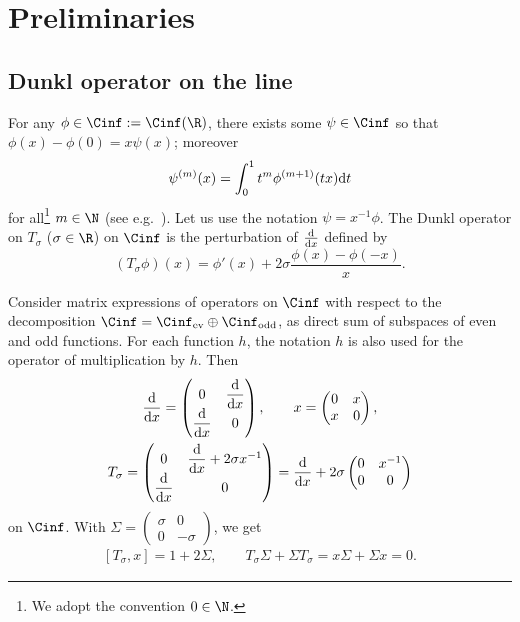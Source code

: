 \section{Preliminaries}\label{s:preliminaries}

\subsection{Dunkl operator on the line}\label{ss:D sigma}

For any $\phi\in\Cinf:=\Cinf(\R)$, there exists some $\psi\in\Cinf$ so that $\phi(x)-\phi(0)=x\psi(x)$; moreover
  \begin{gather}\label{psi (m)(x)}
    \psi^{(m)}(x)=\int_0^1t^m\phi^{(m+1)}(tx){\rm d}t
  \end{gather}
for all\footnote{We adopt the convention $0\in\N$.} $m\in\N$ (see e.g.~\cite[Theorem~1.1.9]{Hormander1990-I}). Let us use the notation $\psi=x^{-1}\phi$. The Dunkl operator on $T_\sigma$ ($\sigma\in\R$) on $\Cinf$ is the perturbation of $\frac{{\rm d}}{{\rm d}x}$ def\/ined by
  \[
    (T_\sigma\phi)(x)=\phi'(x)+2\sigma \frac{\phi(x)-\phi(-x)}{x} .
  \]

Consider matrix expressions of operators on $\Cinf$ with respect to the decomposition $\Cinf=\Cinf_{\text{\rm ev}}\oplus\Cinf_{\text{\rm odd}}$, as direct sum of subspaces of even and odd functions. For each function $h$, the notation $h$ is also used for the operator of multiplication by $h$. Then
  \begin{gather*}
    \frac{{\rm d}}{{\rm d}x}=
      \begin{pmatrix}
        0 &  \dfrac{{\rm d}}{{\rm d}x} \\
        \dfrac{{\rm d}}{{\rm d}x} & 0
      \end{pmatrix} ,\qquad
    x=
      \begin{pmatrix}
        0 &  x \\
        x & 0
      \end{pmatrix} ,\\
    T_\sigma=
      \begin{pmatrix}
        0 &  \dfrac{{\rm d}}{{\rm d}x}+2\sigma x^{-1} \\
        \dfrac{{\rm d}}{{\rm d}x} & 0
      \end{pmatrix}
    = \frac{{\rm d}}{{\rm d}x}+2\sigma
      \begin{pmatrix}
        0 &  x^{-1} \\
        0 & 0
      \end{pmatrix}
  \end{gather*}
on $\Cinf$. With
$
  \Sigma=
    \begin{pmatrix}
      \sigma & 0 \\
      0 & -\sigma
    \end{pmatrix}
$,
we get
  \begin{gather}\label{[D sigma,x]=1+2Sigma, ...}
    [T_\sigma,x]=1+2\Sigma ,\qquad
    T_\sigma\Sigma+\Sigma T_\sigma=x \Sigma+\Sigma x=0 .
  \end{gather}


